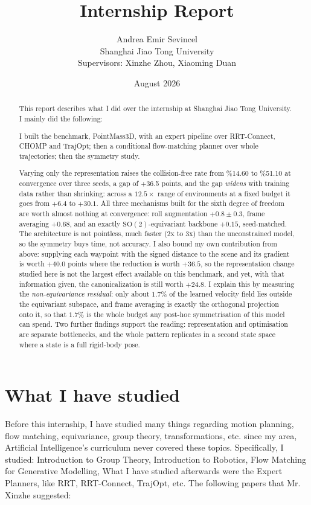 \documentclass[11pt,a4paper]{article}
\title{\large Internship Report}
\author{Andrea Emir Sevincel\\
        {\normalsize Shanghai Jiao Tong University}\\
        {\normalsize Supervisors: Xinzhe Zhou, Xiaoming Duan}}
\date{August 2026}
\newcommand{\SO}{\mathrm{SO}}
\begin{document}
\maketitle

\begin{abstract}
\noindent
This report describes what I did over the internship at Shanghai Jiao Tong University. I mainly did the following:

I built the benchmark, PointMass3D, with an expert pipeline over RRT-Connect,
CHOMP and TrajOpt; then a conditional flow-matching planner over whole
trajectories; then the symmetry study.

Varying only the representation
raises the collision-free rate from \%14.60 to
\%51.10 at convergence over three seeds, a gap of
+36.5 points, and the gap \emph{widens} with training data rather than
shrinking: across a $12.5\times$ range of environments at a fixed budget it goes
from $+6.4$ to $+30.1$. All three mechanisms built for the sixth degree of freedom are worth
almost nothing at convergence: roll augmentation $+0.8 \pm 0.3$, frame averaging
$+0.68$, and an exactly $\SO(2)$-equivariant backbone $+0.15$, seed-matched. The
architecture is not pointless, much faster (2x to 3x) than the unconstrained model, so the symmetry buys
time, not accuracy. I also bound my own contribution from above: supplying each
waypoint with the signed distance to the scene and its gradient is worth $+40.0$
points where the reduction is worth $+36.5$, so the representation change studied
here is not the largest effect available on this benchmark, and yet, with that
information given, the canonicalization is still worth $+24.8$. I explain this  by measuring  the \emph{non-equivariance residual}: only about $1.7\%$ of the learned velocity
field lies outside the equivariant subspace, and frame averaging is exactly the
orthogonal projection onto it, so that $1.7\%$ is the whole budget any post-hoc
symmetrisation of this model can spend. Two further findings support the reading:
representation and optimisation are separate bottlenecks, and the whole pattern
replicates in a second state space where a state is a full rigid-body pose.
\end{abstract}
\section{What I have studied}

Before this internship, I have studied many things regarding motion planning, flow matching, equivariance, group theory, transformations, etc. since my area, Artificial Intelligence's curriculum never covered these topics.
Specifically, I studied: Introduction to Group Theory, Introduction to Robotics, Flow Matching for Generative Modelling, 
What I have studied afterwards were the Expert Planners, like RRT, RRT-Connect, TrajOpt, etc. 
The following papers that Mr. Xinzhe suggested: 
\end{document}
